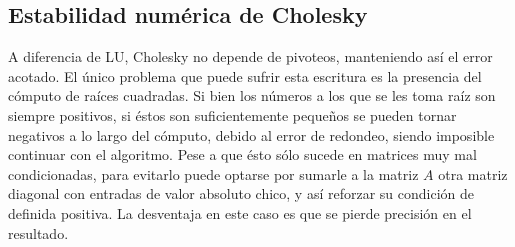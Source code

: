 \subsection{Estabilidad numérica de Cholesky}
A diferencia de LU, Cholesky no depende de pivoteos, manteniendo así el error acotado. El único problema que puede sufrir esta escritura es la presencia del cómputo de raíces cuadradas. Si bien los números a los que se les toma raíz son siempre positivos, si éstos son suficientemente pequeños se pueden tornar negativos a lo largo del cómputo, debido al error de redondeo, siendo imposible continuar con el algoritmo. Pese a que ésto sólo sucede en matrices muy mal condicionadas, para evitarlo puede optarse por sumarle a la matriz $A$ otra matriz diagonal con entradas de valor absoluto chico, y así reforzar su condición de definida positiva. La desventaja en este caso es que se pierde precisión en el resultado.
